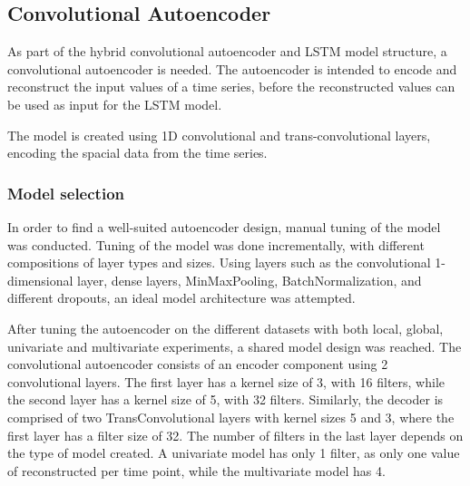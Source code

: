 
\subsection{Convolutional Autoencoder}
\label{section:Method:CNN-AE-LSTM:AE}



As part of the hybrid convolutional autoencoder and LSTM model structure,
a convolutional autoencoder is needed.
The autoencoder is intended to encode and reconstruct the input values of a time series,
before the reconstructed values can be used as input for the LSTM model.

The model is created using 1D convolutional and trans-convolutional layers,
encoding the spacial data from the time series.



\subsubsection{Model selection}

In order to find a well-suited autoencoder design, manual tuning of the model was conducted.
Tuning of the model was done incrementally, with different compositions of layer types and sizes.
Using layers such as the convolutional 1-dimensional layer, dense layers, MinMaxPooling, BatchNormalization, and different dropouts,
an ideal model architecture was attempted.

After tuning the autoencoder on the different datasets with both local, global, univariate and multivariate experiments,
a shared model design was reached.
The convolutional autoencoder consists of an encoder component using 2 convolutional layers.
The first layer has a kernel size of 3, with 16 filters, while the second layer has a kernel size of 5, with 32 filters.
Similarly, the decoder is comprised of two TransConvolutional layers with kernel sizes 5 and 3, where the first layer has a filter size of 32.
The number of filters in the last layer depends on the type of model created. A univariate model has only 1 filter, as only one value of reconstructed per time point,
while the multivariate model has 4.

